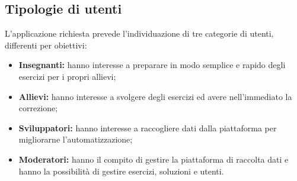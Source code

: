 \subsection{Tipologie di utenti}
L'applicazione richiesta prevede l'individuazione di tre categorie di utenti, differenti per obiettivi:
\begin{itemize}
	\item \textbf{Insegnanti:} hanno interesse a preparare in modo semplice e rapido degli esercizi per i propri allievi;
	\item \textbf{Allievi:} hanno interesse a svolgere degli esercizi ed avere nell'immediato la correzione;
	\item \textbf{Sviluppatori:} hanno interesse a raccogliere dati dalla piattaforma per migliorarne l'automatizzazione;
	\item 
\textbf{Moderatori:} hanno il compito di gestire la piattaforma di raccolta dati e hanno la possibilità di gestire esercizi, soluzioni e utenti.
\end{itemize}
